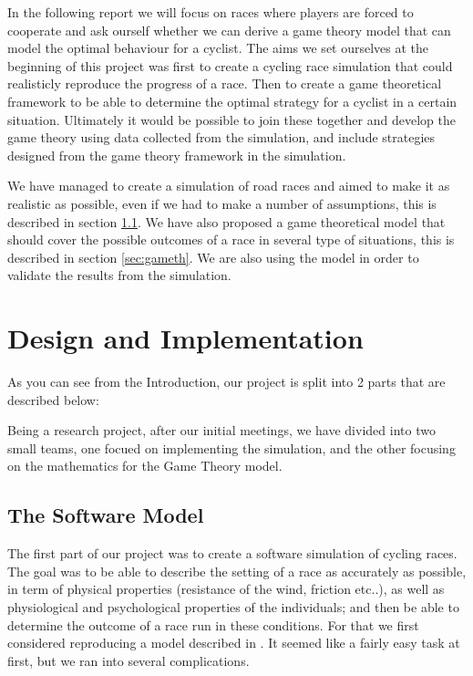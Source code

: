 \documentclass[10pt, a4paper]{report}
\begin{document}
In the following report we will focus on races where players are forced to cooperate and ask ourself  whether we can derive a game theory model that can model the optimal behaviour for a cyclist. The aims we set ourselves at the beginning of this project was first to create a cycling race simulation that could realisticly reproduce the progress of a race. Then to create a game theoretical framework to be able to determine the optimal strategy for a cyclist in a certain situation. Ultimately it would be possible to join these together and develop the game theory using data collected from the simulation, and include strategies designed from the game theory framework in the simulation.

We have managed to create a simulation of road races and aimed to make it as realistic as possible, even if we had to make a number of assumptions, this is described in section \ref{sec:softmodel}. We have also proposed a game theoretical model that should cover the possible outcomes of a race in several type of situations, this is described in section \ref{sec:gameth}. We are also using the model in order to validate the results from the simulation.

\chapter{Design and Implementation}\label{ch:design&impl}

As you can see from the Introduction, our project is split into 2 parts that are described below:

Being a research project, after our initial meetings, we have divided into two small teams, one focued on implementing the simulation, and the other focusing on the mathematics for the Game Theory model.


\section{The Software Model}\label{sec:softmodel}

The first part of our project was to create a software simulation of cycling races. The goal was to be able to describe the setting of a race as accurately as possible, in term of physical properties (resistance of the wind, friction etc..), as well as physiological and psychological properties of the individuals; and then be able to determine the outcome of a race run in these conditions. For that we first considered reproducing a model described in \cite{AgentModel}. It seemed like a fairly easy task at first, but we ran into several complications.
\end{document}
